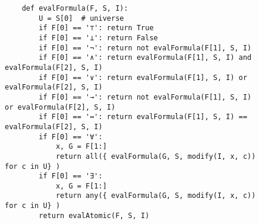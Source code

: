 \begin{figure}[!ht]
\centering
\begin{verbatim}
    def evalFormula(F, S, I):
        U = S[0]  # universe
        if F[0] == '⊤': return True
        if F[0] == '⊥': return False
        if F[0] == '¬': return not evalFormula(F[1], S, I)
        if F[0] == '∧': return evalFormula(F[1], S, I) and evalFormula(F[2], S, I)
        if F[0] == '∨': return evalFormula(F[1], S, I) or evalFormula(F[2], S, I)
        if F[0] == '→': return not evalFormula(F[1], S, I) or evalFormula(F[2], S, I)
        if F[0] == '↔': return evalFormula(F[1], S, I) == evalFormula(F[2], S, I)
        if F[0] == '∀': 
            x, G = F[1:] 
            return all({ evalFormula(G, S, modify(I, x, c)) for c in U} )
        if F[0] == '∃':
            x, G = F[1:] 
            return any({ evalFormula(G, S, modify(I, x, c)) for c in U} )
        return evalAtomic(F, S, I)                   
\end{verbatim}
\vspace*{-0.3cm}
\caption{}
\label{fig:evalFormula.ipynb}
\end{figure}

